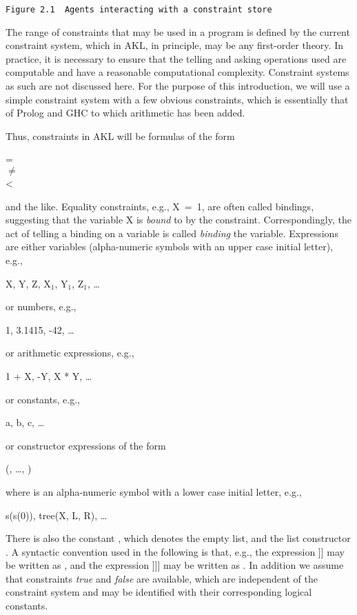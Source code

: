 \verb|Figure 2.1  Agents interacting with a constraint store|

The range of constraints that may be used in a program is defined by
the current constraint system, which in AKL, in principle, may be any
first-order theory.  In practice, it is necessary to ensure that the
telling and asking operations used are computable and have a
reasonable computational complexity.  Constraint systems as such are
not discussed here.  For the purpose of this introduction, we will use
a simple constraint system with a few obvious constraints, which is
essentially that of Prolog and GHC to which arithmetic has been added.

Thus, constraints in AKL will be formulas of the form
%
\begin{progex}
 =  \\
 $\neq$  \\
 < 
\end{progex}%
%
and the like.  Equality constraints, e.g., {\prog X~=~1}, are often
called bindings, suggesting that the variable {\prog X} is {\em bound}
to {} by the constraint.  Correspondingly, the act of telling a
binding on a variable is called {\em binding} the variable.
Expressions are either variables (alpha-numeric symbols with an upper
case initial letter), e.g.,
%
\begin{progex}
X, Y, Z, X$_1$, Y$_1$, Z$_1$, \dots
\end{progex}%
or numbers, e.g.,
%
\begin{progex}
1, 3.1415, -42, \dots
\end{progex}%
%
or arithmetic expressions, e.g.,
%
\begin{progex}
1 + X, -Y, X * Y, \dots
\end{progex}%
%
or constants, e.g.,
%
\begin{progex}
a, b, c, \dots
\end{progex}%
%
or constructor expressions of the form
%
\begin{progex}
(, \dots, )
\end{progex}%
%
where  is an alpha-numeric symbol with a lower case initial
letter, e.g.,
%
\begin{progex}
s(s(0)), tree(X, L, R), \dots
\end{progex}%
%
There is also the constant {\prog []}, which denotes the empty list,
and the list constructor {}.  A syntactic convention used in
the following is that, e.g., the expression {\prog [a|[b|[c|d]]]} may
be written as {\prog [a, b, c|d]}, and the expression {\prog
[a|[b|[c|[]]]]} may be written as {\prog [a, b, c]}.  In addition we
assume that constraints {\em true} and {\em false} are available,
which are independent of the constraint system and may be identified
with their corresponding logical constants.


